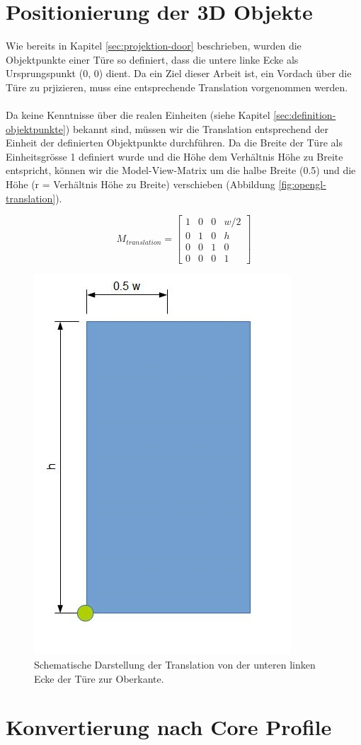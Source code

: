 \section{Positionierung der 3D Objekte}

Wie bereits in Kapitel \ref{sec:projektion-door} beschrieben, wurden die Objektpunkte einer Türe so definiert, dass die untere linke Ecke als Ursprungspunkt (0, 0) dient. Da ein Ziel dieser Arbeit ist, ein Vordach über die Türe zu prjizieren, muss eine entsprechende Translation vorgenommen werden.
\noindent \paragraph{}
Da keine Kenntnisse über die realen Einheiten (siehe Kapitel \ref{sec:definition-objektpunkte}) bekannt sind, müssen wir die Translation entsprechend der Einheit der definierten Objektpunkte durchführen. Da die Breite der Türe als Einheitsgrösse 1 definiert wurde und die Höhe dem Verhältnis Höhe zu Breite entspricht, können wir die Model-View-Matrix um die halbe Breite (0.5) und die Höhe (r = Verhältnis Höhe zu Breite) verschieben (Abbildung \ref{fig:opengl-translation}).

\begin{equation}
M_{translation}
=
\begin{bmatrix}
1 & 0 & 0 & w/2 \\
0 & 1 & 0 & h \\
0 & 0 & 1 & 0 \\
0 & 0 & 0 & 1
\end{bmatrix} 
\end{equation}


\begin{figure}[!ht]
\centering
\includegraphics[scale=0.5]{images/opengl-translation.jpg} 
\caption{Schematische Darstellung der Translation von der unteren linken Ecke der Türe zur Oberkante.}
\label{fig:opencv-perspektive}
\end{figure}


\section{Konvertierung nach Core Profile}

